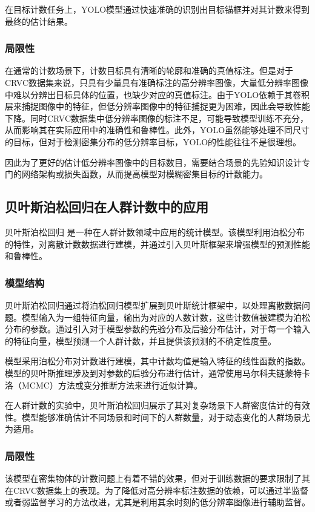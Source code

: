 在目标计数任务上，YOLO模型通过快速准确的识别出目标锚框并对其计数来得到最终的估计结果。

\subsubsection{局限性}
在通常的计数场景下，计数目标具有清晰的轮廓和准确的真值标注。但是对于CRVC数据集来说，只具有少量具有准确标注的高分辨率图像，大量低分辨率图像中难以分辨出目标具体的位置，也缺少对应的真值标注。由于YOLO依赖于其卷积层来捕捉图像中的特征，但低分辨率图像中的特征捕捉更为困难，因此会导致性能下降。同时CRVC数据集中低分辨率图像的标注不足，可能导致模型训练不充分，从而影响其在实际应用中的准确性和鲁棒性。此外，YOLO虽然能够处理不同尺寸的目标，但对于检测密集分布的低分辨率目标，YOLO的性能往往不是很理想。

因此为了更好的估计低分辨率图像中的目标数目，需要结合场景的先验知识设计专门的网络架构或损失函数，从而提高模型对模糊密集目标的计数能力。

\subsection{贝叶斯泊松回归在人群计数中的应用}
贝叶斯泊松回归\cite{2009BayesianPoissonRegressionCrowdCounting} 是一种在人群计数领域中应用的统计模型。该模型利用泊松分布的特性，对离散计数数据进行建模，并通过引入贝叶斯框架来增强模型的预测性能和鲁棒性。

\subsubsection{模型结构}
贝叶斯泊松回归通过将泊松回归模型扩展到贝叶斯统计框架中，以处理离散数据问题。模型输入为一组特征向量，输出为对应的人数计数，这些计数值被建模为泊松分布的参数。通过引入对于模型参数的先验分布及后验分布估计，对于每一个输入的特征向量，模型预测一个人群计数，并且提供该预测的不确定性度量。

模型采用泊松分布对计数进行建模，其中计数均值是输入特征的线性函数的指数。模型的贝叶斯推理涉及到对参数的后验分布进行估计，通常使用马尔科夫链蒙特卡洛（MCMC）方法或变分推断方法来进行近似计算。

在人群计数的实验中，贝叶斯泊松回归展示了其对复杂场景下人群密度估计的有效性。模型能够准确估计不同场景和时间下的人群数量，对于动态变化的人群场景尤为适用。

\subsubsection{局限性}
该模型在密集物体的计数问题上有着不错的效果，但对于训练数据的要求限制了其在CRVC数据集上的表现。为了降低对高分辨率标注数据的依赖，可以通过半监督或者弱监督学习的方法改进，尤其是利用其余时刻的低分辨率图像进行辅助监督。


